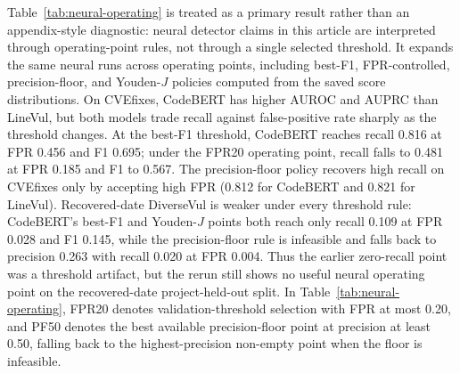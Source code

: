 \documentclass[a4paper,fleqn]{cas-dc}
\begin{document}
Table~\ref{tab:neural-operating} is treated as a primary result rather than an
appendix-style diagnostic: neural detector claims in this article are interpreted
through operating-point rules, not through a single selected threshold.
It expands the same neural runs across operating points, including best-F1,
FPR-controlled, precision-floor, and Youden-\(J\) policies computed from the
saved score distributions. On CVEfixes, CodeBERT has
higher AUROC and AUPRC than LineVul, but both models trade recall against
false-positive rate sharply as the threshold changes. At the best-F1 threshold,
CodeBERT reaches recall 0.816 at FPR 0.456 and F1 0.695; under the FPR20
operating point, recall falls to 0.481 at FPR 0.185 and F1 to 0.567. The
precision-floor policy recovers high recall on CVEfixes only by accepting high
FPR (0.812 for CodeBERT and 0.821 for LineVul). Recovered-date DiverseVul is
weaker under every threshold rule: CodeBERT's best-F1 and Youden-\(J\) points
both reach only recall 0.109 at FPR 0.028 and F1 0.145, while the
precision-floor rule is infeasible and falls back to precision 0.263 with
recall 0.020 at FPR 0.004. Thus the earlier zero-recall point was a threshold
artifact, but the rerun still shows no useful neural operating point on the
recovered-date project-held-out split.
In Table~\ref{tab:neural-operating}, FPR20 denotes validation-threshold
selection with FPR at most 0.20, and PF50 denotes the best available
precision-floor point at precision at least 0.50, falling back to the
highest-precision non-empty point when the floor is infeasible.

\begin{table}
\centering
\caption{Operating-point summary for full-dataset project-held-out neural runs.}
\label{tab:neural-operating}
\scriptsize
\setlength{\tabcolsep}{3pt}
\end{table}
\end{document}
